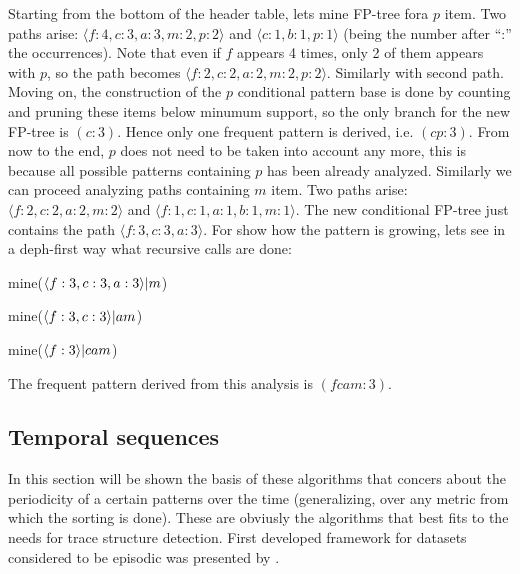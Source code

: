 Starting from the bottom of the header table, lets mine FP-tree fora $p$ item. Two
paths arise: $\langle f:4,c:3,a:3,m:2,p:2 \rangle$ and $\langle c:1, b:1, p:1
\rangle$ (being the number after ``:'' the occurrences). Note that even if $f$
appears 4 times, only 2 of them appears with $p$, so the path becomes $\langle 
f:2,c:2,a:2,m:2,p:2 \rangle$. Similarly with second path. Moving on, the
construction of the $p$ conditional pattern base is done by counting and pruning
these items below minumum support, so the only branch for the new FP-tree is
$(c:3)$. Hence only one frequent pattern is derived, i.e. $(cp:3)$. From now to
the end, $p$ does not need to be taken into account any more, this is because
all possible patterns containing $p$ has been already analyzed. Similarly we can proceed analyzing paths containing $m$ item. Two paths arise: 
$\langle f:2,c:2,a:2,m:2 \rangle$ and $\langle f:1,c:1,a:1,b:1,m:1 \rangle$. The
new conditional FP-tree just contains the path $\langle f:3,c:3,a:3 \rangle$.
For show how the pattern is growing, lets see in a deph-first way what
recursive calls are done:
\begin{enumerate*}[label=(\roman*)]
  \item mine($\langle f:3,c:3,a:3 \rangle \text{\textbar} m$)
  \item mine($\langle f:3,c:3 \rangle \text{\textbar} am$)
  \item mine($\langle f:3 \rangle \text{\textbar} cam$)
\end{enumerate*}
The frequent pattern derived from this analysis is $(fcam:3)$.

\subsection{Temporal sequences}\label{ss:temporal_sequences}

In this section will be shown the basis of these algorithms that concers about
the periodicity of a certain patterns over the time (generalizing, over any
metric from which the sorting is done). These are obviusly the
algorithms that best fits to the needs for trace structure detection. First
developed framework for datasets considered to be episodic was presented by
\cite{mannila1995discovering}.

